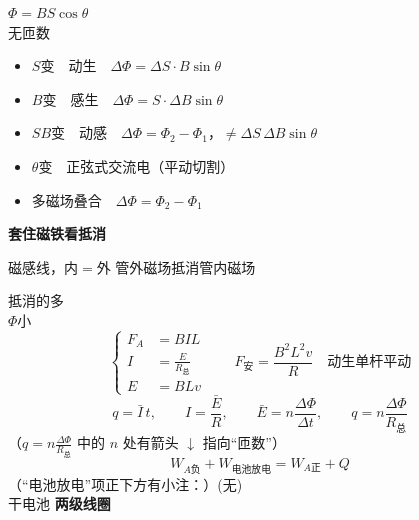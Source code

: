 \begin{center}
$\Phi=BS\cos\theta$\\
无匝数
\end{center}
\begin{itemize}
  \item $S$变　动生　$\Delta\Phi=\Delta S\cdot B\sin\theta$
  \item $B$变　感生　$\Delta\Phi=S\cdot\Delta B\sin\theta$
  \item $SB$变　动感　$\Delta\Phi=\Phi_2-\Phi_1$，$\ne\Delta S\,\Delta B\sin\theta$
  \item $\theta$变　正弦式交流电（平动切割）
  \item 多磁场叠合　$\Delta\Phi=\Phi_2-\Phi_1$
\end{itemize}
\textbf{套住磁铁看抵消}

磁感线，内$=$外
管外磁场抵消管内磁场

抵消的多\\
$\Phi$小
\[
\left\{\begin{aligned}
F_A&=BIL\\
I&=\frac{E}{R_{\text{总}}}\\
E&=BLv
\end{aligned}\right.
\qquad F_{\text{安}}=\frac{B^2L^2v}{R}\quad\text{动生单杆平动}
\]
\[
q=\bar I\,t,\qquad I=\frac{\bar E}{R},\qquad \bar E=n\frac{\Delta\Phi}{\Delta t},\qquad q=n\frac{\Delta\Phi}{R_{\text{总}}}
\]
（$q=n\frac{\Delta\Phi}{R_{\text{总}}}$ 中的 $n$ 处有箭头 $\downarrow$ 指向“匝数”）
\[
W_{A\text{负}}+W_{\text{电池放电}}=W_{A\text{正}}+Q
\]
（“电池放电”项正下方有小注：）(无)\\
干电池
\textbf{两级线圈}

